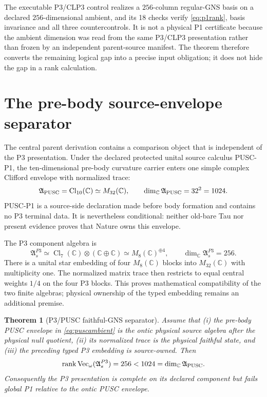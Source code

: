 \documentclass[11pt,a4paper]{article}
\newtheorem{theorem}[definition]{Theorem}
\theoremstyle{remark}
\newcommand{\Aseed}{\mathfrak A_s}
\begin{document}
The executable P3/CLP3 control realizes a $256$-column regular-GNS basis on a
declared $256$-dimensional ambient, and its 18 checks verify
\eqref{eq:p1rank}, basis invariance and all three countercontrols.  It is not a
physical P1 certificate because the ambient dimension was read from the same
P3/CLP3 presentation rather than frozen by an independent parent-source
manifest.  The theorem therefore converts the remaining logical gap into a
precise input obligation; it does not hide the gap in a rank calculation.

\section{The pre-body source-envelope separator}

The central parent derivation contains a comparison object that is independent
of the P3 presentation.  Under the declared protected unital source calculus
PUSC-P1, the ten-dimensional pre-body curvature carrier enters one simple
complex Clifford envelope with normalized trace:
\begin{equation}
 \mathfrak A_{\rm PUSC}
 =\operatorname{Cl}_{10}(\mathbb C)
 \simeq M_{32}(\mathbb C),
 \qquad
 \dim_{\mathbb C}\mathfrak A_{\rm PUSC}=32^2=1024.
 \label{eq:puscambient}
\end{equation}
PUSC-P1 is a source-side declaration made before body formation and contains
no P3 terminal data.  It is nevertheless conditional: neither old-bare Tau
nor present evidence proves that Nature owns this envelope.

The P3 component algebra is
\begin{equation}
 \Aseed^{P3}
 \simeq \operatorname{Cl}_{7}(\mathbb C)
       \otimes(\mathbb C\oplus\mathbb C)
 \simeq M_8(\mathbb C)^{\oplus4},
 \qquad
 \dim_{\mathbb C}\Aseed^{P3}=256.
 \label{eq:p3insidepusc}
\end{equation}
There is a unital star embedding of four $M_8(\mathbb C)$ blocks into
$M_{32}(\mathbb C)$ with multiplicity one.  The normalized matrix trace then
restricts to equal central weights $1/4$ on the four P3 blocks.  This proves
mathematical compatibility of the two finite algebras; physical ownership of
the typed embedding remains an additional premise.

\begin{theorem}[P3/PUSC faithful-GNS separator]
Assume that (i) the pre-body PUSC envelope in
\eqref{eq:puscambient} is the ontic physical source algebra after the physical
null quotient, (ii) its normalized trace is the physical faithful state, and
(iii) the preceding typed P3 embedding is source-owned.  Then
\begin{equation}
 \operatorname{rank}\operatorname{Vec}_{\omega}(\Aseed^{P3})=256
 <1024=\dim_{\mathbb C}\mathfrak A_{\rm PUSC}.
 \label{eq:p3puscrank}
\end{equation}
Consequently the P3 presentation is complete on its declared component but
fails global P1 relative to the ontic PUSC envelope.
\end{theorem}
\end{document}
